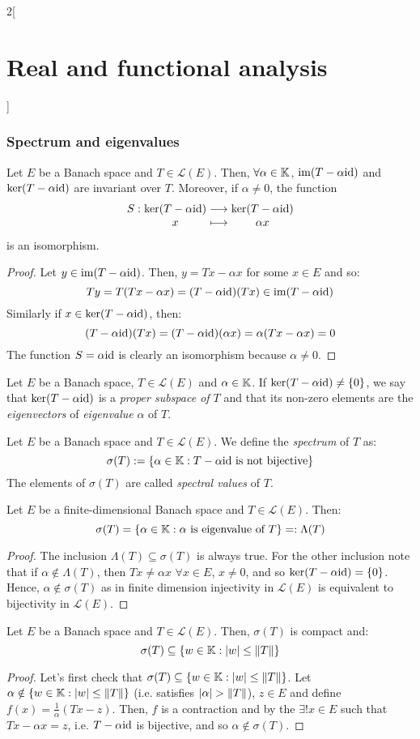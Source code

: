 \documentclass[../../../main_math.tex]{subfiles}
\begin{document}
\begin{multicols}{2}[\section{Real and functional analysis}]
  \subsubsection{Spectrum and eigenvalues}
  \begin{proposition}
    Let $E$ be a Banach space and $T\in\mathcal{L}(E)$. Then, $\forall \alpha\in\mathbb{K}$, $\operatorname{im}(T-\alpha\mathrm{id})$ and $\ker(T-\alpha\mathrm{id})$ are invariant over $T$. Moreover, if $\alpha\ne 0$, the function $$\function{S}{\ker(T-\alpha\id)}{\ker(T-\alpha\id)}{x}{\alpha x}$$ is an isomorphism.
  \end{proposition}
  \begin{proof}
    Let $y\in \operatorname{im}(T-\alpha \mathrm{id})$. Then, $y=Tx-\alpha x$ for some $x\in E$ and so: $$Ty=T(Tx-\alpha x)=(T-\alpha\mathrm{id})(Tx)\in\operatorname{im}(T-\alpha\mathrm{id})$$
    Similarly if $x\in\ker(T-\alpha\mathrm{id})$, then: $$(T-\alpha\mathrm{id})(Tx)=(T-\alpha\mathrm{id})(\alpha x)=\alpha(Tx-\alpha x)=0$$
    The function $S=\alpha \mathrm{id}$ is clearly an isomorphism because $\alpha\ne 0$.
  \end{proof}
  \begin{definition}
    Let $E$ be a Banach space, $T\in\mathcal{L}(E)$ and $\alpha\in \mathbb{K}$. If $\ker(T-\alpha\mathrm{id})\ne\{0\}$, we say that $\ker(T-\alpha\mathrm{id})$ is a \emph{proper subspace of $T$} and that its non-zero elements are the \emph{eigenvectors} of \emph{eigenvalue} $\alpha$ of $T$.
  \end{definition}
  \begin{definition}
    Let $E$ be a Banach space and $T\in\mathcal{L}(E)$. We define the \emph{spectrum} of $T$ as: $$\sigma(T):=\{\alpha\in\mathbb{K}:T-\alpha\mathrm{id}\text{ is not bijective}\}$$
    The elements of $\sigma(T)$ are called \emph{spectral values} of $T$.
  \end{definition}
  \begin{proposition}
    Let $E$ be a finite-dimensional Banach space and $T\in\mathcal{L}(E)$. Then: $$\sigma(T)=\{\alpha\in\mathbb{K}:\alpha\text{ is eigenvalue of }T\}=:\Lambda(T)$$
  \end{proposition}
  \begin{proof}
    The inclusion $\Lambda(T)\subseteq \sigma(T)$ is always true. For the other inclusion note that if $\alpha\notin \Lambda(T)$, then $Tx\ne \alpha x$ $\forall x\in E$, $x\ne 0$, and so $\ker (T-\alpha \mathrm{id})=\{0\}$. Hence, $\alpha\notin \sigma(T)$ as in finite dimension injectivity in $\mathcal{L}(E)$ is equivalent to bijectivity in $\mathcal{L}(E)$.
  \end{proof}
  \begin{proposition}
    Let $E$ be a Banach space and $T\in\mathcal{L}(E)$. Then, $\sigma(T)$ is compact and: $$\sigma(T)\subseteq\{w\in \mathbb{K}:\abs{w}\leq\left\|T\right\|\}$$
  \end{proposition}
  \begin{proof}
    Let's first check that $\sigma(T)\subseteq\{w\in \mathbb{K}:\abs{w}\leq\left\|T\right\|\}$. Let $\alpha\notin\{w\in \mathbb{K}:\abs{w}\leq\left\|T\right\|\}$ (i.e. satisfies $\abs{\alpha}>\left\|T\right\|$), $z\in E$ and define $f(x)=\frac{1}{\alpha} (Tx-z)$. Then, $f$ is a contraction and by the  $\exists!x\in E$ such that $Tx-\alpha x=z$, i.e. $T-\alpha\mathrm{id}$ is bijective, and so $\alpha\notin\sigma (T)$.


\end{proof}
\end{multicols}
\end{document}
